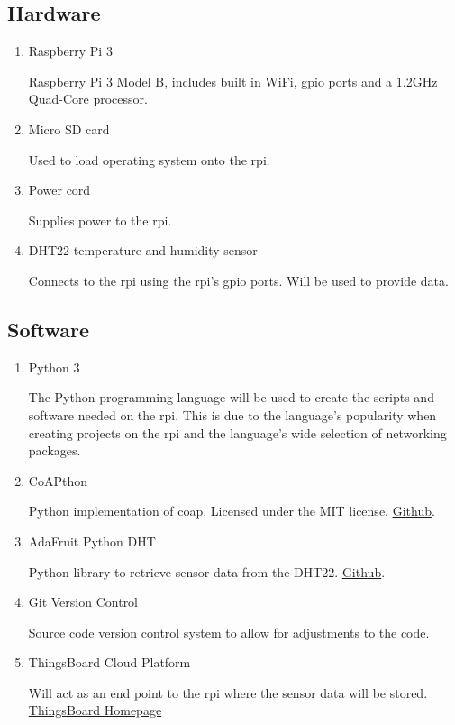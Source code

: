 \subsection{Hardware}
\begin{enumerate}
    \item Raspberry Pi 3

        Raspberry Pi 3 Model B, includes built in WiFi, \gls{gpio} ports and a 1.2GHz Quad-Core processor.
    \item Micro SD card
    
        Used to load operating system onto the \gls{rpi}.
    \item Power cord
    
        Supplies power to the \gls{rpi}.
    \item DHT22 temperature and humidity sensor
    
        Connects to the \gls{rpi} using the \gls{rpi}'s \gls{gpio} ports. Will be used to provide data.

\end{enumerate}

\subsection{Software}
\begin{enumerate}
    \item Python 3

        The Python programming language will be used to create the scripts and software needed on the \gls{rpi}.
        This is due to the language's popularity when creating projects on the \gls{rpi} and the language's wide selection
        of networking packages.
    \item CoAPthon
    
        Python implementation of \gls{coap}. Licensed under the MIT license. \href{https://github.com/Tanganelli/CoAPthon}{Github}.

    \item AdaFruit Python DHT
        
        Python library to retrieve sensor data from the DHT22. \href{https://github.com/adafruit/Adafruit_Python_DHT}{Github}.

    \item Git Version Control
    
        Source code version control system to allow for adjustments to the code.

    \item ThingsBoard Cloud Platform
    
        Will act as an end point to the \gls{rpi} where the sensor data will be stored. \href{https://thingsboard.io}{ThingsBoard Homepage}
\end{enumerate}